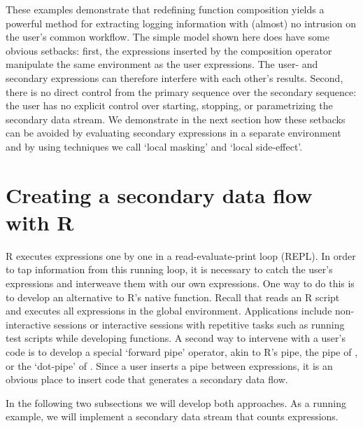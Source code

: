 These examples demonstrate that redefining function composition yields a
powerful method for extracting logging information with (almost) no intrusion
on the user's common workflow. The simple model shown here does have some
obvious setbacks: first, the expressions inserted by the composition operator
manipulate the same environment as the user expressions. The user- and
secondary expressions can therefore interfere with each other's results.
Second, there is no direct control from the primary sequence over the secondary
sequence: the user has no explicit control over starting, stopping, or
parametrizing the secondary data stream.  We demonstrate in the next section
how these setbacks can be avoided by evaluating secondary expressions in a
separate environment and by using techniques we call `local masking' and
`local side-effect'.



\section{Creating a secondary data flow with R}
R executes expressions one by one in a read-evaluate-print loop (REPL). In
order to tap information from this running loop, it is necessary to catch the
user's expressions and interweave them with our own expressions. One way to do
this is to develop an alternative to R's native  function.
Recall that  reads an R script and executes all expressions in
the global environment. Applications include non-interactive sessions or
interactive sessions with repetitive tasks such as running test scripts while
developing functions. A second way to intervene with a user's code is to
develop a special `forward pipe' operator, akin to R's \code{|>} pipe,
the  pipe of \citet{bache2014magrittr}, or the `dot-pipe' of
\citet{mount2018dot}. Since a user inserts a pipe between expressions, it is an
obvious place to insert code that generates a secondary data flow.

In the following two subsections we will develop both approaches. As a running
example, we will implement a secondary data stream that counts expressions. 

